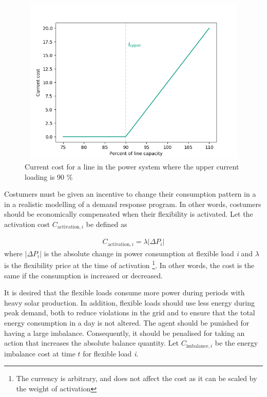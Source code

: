 \documentclass[class=book, crop=false, 11pt]{standalone}
\begin{document}
\begin{figure}[ht]
    \center
\includegraphics[height=8cm, width=12cm]{figures/current_cost.png}
    \caption  {Current cost for a line in the power system where the upper current loading is 90 \%}
    \label{fig:problem:current_cost}
\end{figure}
Costumers must be given an incentive to change their consumption pattern in a in a realistic modelling of a demand response program. In other words, costumers should be economically compensated when their flexibility is activated. Let the activation cost $C_{\textrm{activation},i}$ be defined as

\begin{equation}
   \begin{aligned}
   \label{eq:problem:activation_cost}
    C_{\textrm{activation},i} = \lambda |\Delta P_{i}|
    \end{aligned} 
\end{equation}
where $|\Delta P_{i}|$  is the absolute change in power consumption at flexible load \textit{i} and $\lambda$ is the flexibility price at the time of activation \footnote{The currency is arbitrary, and does not affect the cost as it can be scaled by the weight of activation}. In other words, the cost is the same if the consumption is increased or decreased.

It is desired that the flexible loads consume more power during periods with heavy solar production. In addition, flexible loads should use less energy during peak demand, both to reduce violations in the grid and to ensure that the total energy consumption in a day is not altered. The agent should be punished for having a large imbalance. Consequently, it should be penalised for taking an action that increases the absolute balance quantity. Let $C_{\textrm{imbalance},i}$ be the energy imbalance cost at time $t$ for flexible load \textit{i}.
\end{document}
